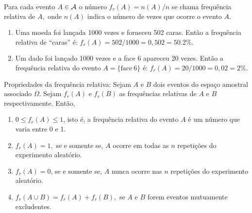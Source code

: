 \begin{frame}


\begin{defi} 
Para cada evento $A \in {\cal A}$ o número $f_r(A)={n(A)}/{n}$ se chama frequência
relativa de $A,$ onde $n(A)$ indica o número de vezes que ocorre o evento $A.$
\end{defi}

\begin{exem}
\begin{enumerate}
\item Uma moeda foi lançada 1000 vezes e forneceu 502 caras. Então a frequência relativa de ``caras'' é: 
$f_r(A) = 502 / 1000 = 0,502 = 50.2\%.$
\item Um dado foi lançado 1000 vezes e a face 6 apareceu 20 vezes. Então a frequência relativa do evento $A = \{ \text{face} \ 6 \}$ é: 
$f_r(A)  = 20 / 1000 = 0,02 = 2\% .$
\end{enumerate}
\end{exem}

 \begin{block}{Propriedades da frequência relativa:} 
Sejam $A$ e $B$ dois eventos do espaço amostral associado $\Omega$. Sejam $f_r(A)$   e $f_r(B)$ as frequências relativas de $A$ e $B$ respectivamente. Então, 
\begin{enumerate}
\item $ 0 \leq f_r(A) \leq 1$, isto é, a frequência relativa do evento $A$ é um número que varia entre 0 e 1. 
\item  $f_r(A)=1,$  se e somente se, $A$ ocorre em todas as $n$ repetições do experimento aleatório. 
\item  $f_r(A)=0$, se e somente se, $A$ nunca ocorre nas $n$ repetições do experimento aleatório. 
\item  $f_r(A \cup B)= f_r(A) + f_r(B),$ se $A$ e $B$ forem eventos mutuamente excludentes. 
\end{enumerate}
 \end{block}
 


\end{frame}

